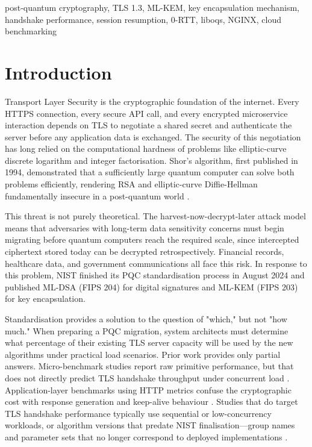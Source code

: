 \documentclass[conference]{IEEEtran}
\begin{document}
\begin{IEEEkeywords}
post-quantum cryptography, TLS 1.3, ML-KEM, key encapsulation mechanism,
handshake performance, session resumption, 0-RTT, liboqs, NGINX, cloud benchmarking
\end{IEEEkeywords}

\section{Introduction}

Transport Layer Security is the cryptographic foundation of the internet. Every HTTPS
connection, every secure API call, and every encrypted microservice interaction depends
on TLS to negotiate a shared secret and authenticate the server before any application
data is exchanged. The security of this negotiation has long relied on the computational
hardness of problems like elliptic-curve discrete logarithm and integer factorisation.
Shor's algorithm, first published in 1994, demonstrated that a sufficiently large quantum
computer can solve both problems efficiently, rendering RSA and elliptic-curve
Diffie-Hellman fundamentally insecure in a post-quantum world \cite{b1}.

This threat is not purely theoretical. The harvest-now-decrypt-later attack model means
that adversaries with long-term data sensitivity concerns must begin migrating before
quantum computers reach the required scale, since intercepted ciphertext stored today can
be decrypted retrospectively. Financial records, healthcare data, and government
communications all face this risk. In response to this problem, NIST finished its PQC standardisation process in August 2024 and published ML-DSA (FIPS 204) \cite{b3} for digital signatures and ML-KEM (FIPS 203) \cite{b2} for key encapsulation.

Standardisation provides a solution to the question of "which," but not "how much." When preparing a PQC migration, system architects must determine what percentage of their existing TLS server capacity will be used by the new algorithms under practical load scenarios. Prior work provides only partial answers. Micro-benchmark studies report raw primitive performance, but that does not directly predict TLS handshake throughput under concurrent load \cite{b8}. Application-layer benchmarks using HTTP metrics confuse the cryptographic cost with response generation and keep-alive behaviour \cite{b9}. Studies that do target TLS handshake
performance typically use sequential or low-concurrency workloads, or algorithm
versions that predate NIST finalisation---group names and parameter sets that no
longer correspond to deployed implementations \cite{b8}\cite{b10}.
\end{document}
